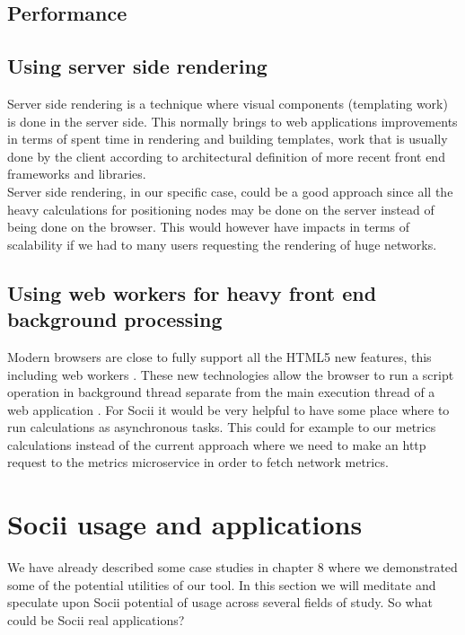 \subsection{Performance}

\subsection*{Using server side rendering}
Server side rendering is a technique where visual components (templating work) is done in the server side. This normally brings to web applications improvements in terms of spent time in rendering and building templates, work that is usually done by the client according to architectural definition of more recent front end frameworks and libraries.\\
\indent Server side rendering, in our specific case, could be a good approach since all the heavy calculations for positioning nodes
may be done on the server instead of being done on the browser. This would however have impacts in terms of scalability if we had to many users requesting
the rendering of huge networks.

\subsection*{Using web workers for heavy front end background processing}
Modern browsers are close to fully support all the HTML5 new features, this including web workers \citep{webworkers}. These new technologies allow
the browser to run a script operation in background thread separate from the main execution thread of a web application \citep{mdnwebworkers}. For Socii it would be very helpful to have some place where to run calculations as asynchronous tasks. This could for example to our metrics calculations instead of the current approach where we need to make an http request to the metrics microservice in order to fetch network metrics.

\section{Socii usage and applications}
We have already described some case studies in chapter 8 where we demonstrated some of the potential utilities of our tool. In this section we will meditate and speculate upon Socii potential of usage across several fields of study. So what could be Socii real applications?

